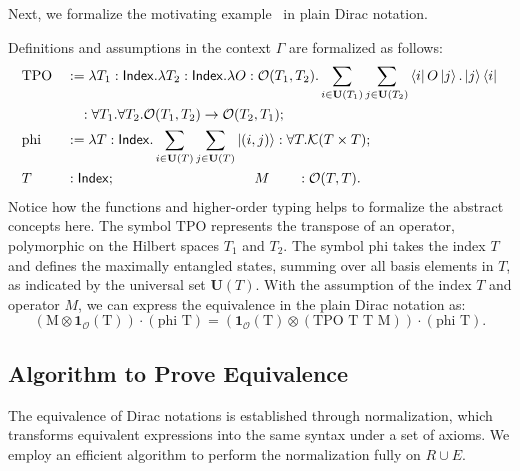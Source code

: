 Next, we formalize the motivating example~ in
plain Dirac notation.
\begin{example}
    \label{ex: formalizing motivating}
    Definitions and assumptions in the context \( \Gamma \) are formalized as follows:
    \begin{align*}
        & \text{TPO} && := \lambda T_1 : \mathsf{Index}. \lambda T_2 : \mathsf{Index}. \lambda O : \mathcal{O}(T_1, T_2). \sum_{i \in \mathbf{U}(T_1)} \sum_{j \in \mathbf{U}(T_2)} \bra{i} O \ket{j} . \ket{j}\bra{i} \\
        & &&\quad : \forall T_1. \forall T_2. \mathcal{O}(T_1, T_2) \to \mathcal{O}(T_2, T_1); \\
        &\text{phi} &&:= \lambda T : \mathsf{Index}. \sum_{i \in \mathbf{U}(T)} \sum_{j \in \mathbf{U}(T)} \ket{(i, j)} : \forall T.\mathcal{K}(T \times T); \\
        & T && : \mathsf{Index};  \qquad \qquad \qquad \qquad \qquad M \qquad : \mathcal{O}(T, T).
    \end{align*}
    Notice how the functions and higher-order typing helps to formalize the abstract concepts here.
    The symbol \( \text{TPO} \) represents the transpose of an operator, polymorphic on the Hilbert spaces \( T_1 \) and \( T_2 \). 
    The symbol \( \text{phi} \) takes the index \( T \) and defines the maximally entangled states, summing over all basis elements in \( T \), as indicated by the universal set \( \mathbf{U}(T) \).
    With the assumption of the index \( T \) and operator \( M \), we can express the equivalence in the plain Dirac notation as:
    \[
    (\textrm{M} \otimes \mathbf{1}_\mathcal{O}(\textrm{T})) \cdot (\textrm{phi T}) = (\mathbf{1}_\mathcal{O}(\textrm{T}) \otimes (\textrm{TPO T T M})) \cdot (\textrm{phi T}).
    \]
\end{example}



\subsection{Algorithm to Prove Equivalence}

The equivalence of Dirac notations is established through normalization, which transforms equivalent expressions into the same syntax under a set of axioms. We employ an efficient algorithm to perform the normalization fully on $R \cup E$.

